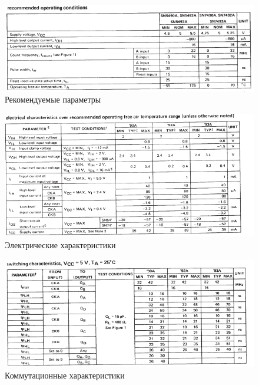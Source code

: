 \begin{figure}[H]
	\centering
	\includegraphics[width=0.8\linewidth]{imgs/13/13_rec}
	\caption{Рекомендуемые параметры}
	\label{fig:13_rec}
\end{figure}

\begin{figure}[H]
	\centering
	\includegraphics[width=0.95\linewidth]{imgs/13/13_ch}
	\caption{Электрические характеристики}
	\label{fig:13_ch}
\end{figure}

\begin{figure}[H]
	\centering
	\includegraphics[width=0.95\linewidth]{imgs/13/13_switch}
	\caption{Коммутационные характеристики}
	\label{fig:13_switch}
\end{figure}
